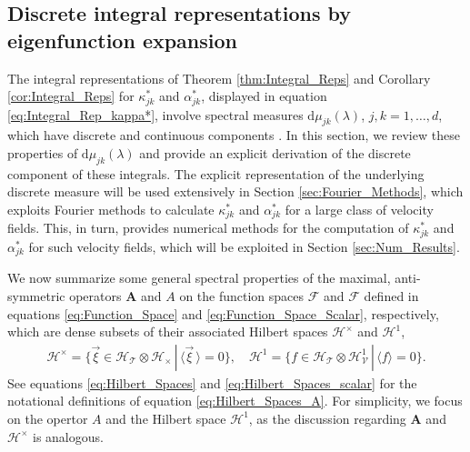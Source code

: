 \documentclass[11pt]{amsart}
\renewcommand{\d}{\mathrm{d}}
\newcommand{\Ab}{\mathbf{A}}
\newcommand{\Tc}{\mathcal{T}}
\newcommand{\Vc}{\mathcal{V}}
\newcommand{\Hc}{\mathcal{H}}
\newcommand{\Fc}{\mathcal{F}}
\newcommand{\Hs}{\mathscr{H}}
\newcommand{\Fs}{\mathscr{F}}
\begin{document}
\subsection{Discrete integral representations by eigenfunction
  expansion}\label{sec:Eig_Funct_Exp} 
%
The integral representations of Theorem \ref{thm:Integral_Reps} and
Corollary \ref{cor:Integral_Reps} for $\kappa^*_{jk}$ and $\alpha^*_{jk}$,
displayed in equation \eqref{eq:Integral_Rep_kappa*},  involve
spectral measures $\d\mu_{jk}(\lambda)$, $j,k=1,\ldots,d$, which have discrete and
continuous components \cite{Reed-1980,Stone:64}. In this section, we
review these properties of $\d\mu_{jk}(\lambda)$ and provide an explicit
derivation of the discrete component of these integrals. The 
explicit representation of the underlying discrete measure will
be used extensively in Section \ref{sec:Fourier_Methods}, which
exploits Fourier methods to calculate $\kappa^*_{jk}$ and $\alpha^*_{jk}$ for a
large class of velocity fields. This, in turn, provides numerical
methods for the computation of $\kappa^*_{jk}$ and $\alpha^*_{jk}$ for such
velocity fields, which will be exploited in Section
\ref{sec:Num_Results}.   



We now summarize some general spectral properties of the maximal,
anti-symmetric operators $\Ab$ and $A$ on the function spaces $\Fs$
and $\Fc$ defined in equations \eqref{eq:Function_Space} and
\eqref{eq:Function_Space_Scalar}, respectively, which are dense
subsets of their associated Hilbert spaces $\Hs^\times$ and $\Hc^1$,  
%
\begin{align}\label{eq:Hilbert_Spaces_A}
  \Hs^\times=\{\vec{\xi}\in \Hs_\Tc\otimes\Hs_\times \,|\, \langle\vec{\xi}\,\rangle=0\},\quad
  \Hc^1=\{f\in \Hc_\Tc\otimes\Hc^1_\Vc \,|\, \langle f\rangle=0\}.
\end{align}
%
See equations \eqref{eq:Hilbert_Spaces} and
\eqref{eq:Hilbert_Spaces_scalar} for the notational definitions of
equation \eqref{eq:Hilbert_Spaces_A}. For simplicity, we focus on the 
opertor $A$ and the Hilbert space $\Hc^1$, as the discussion regarding
$\Ab$ and $\Hs^\times$ is analogous.
\end{document}
